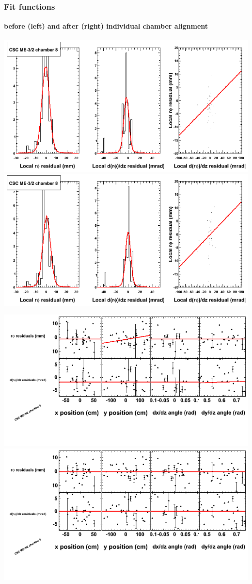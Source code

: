 \documentclass[compress]{beamer}
\begin{document}
\begin{frame}
\frametitle{Fit functions}
\framesubtitle{before (left) and after (right) individual chamber alignment}
\includegraphics[width=0.5\linewidth]{ringfits_3dof/beforefit_MEm32_08_bellcurve.png} \includegraphics[width=0.5\linewidth]{ringfits_3dof/afterfit_MEm32_08_bellcurve.png}

\includegraphics[width=0.5\linewidth]{ringfits_3dof/beforefit_MEm32_08_polynomials.png} \includegraphics[width=0.5\linewidth]{ringfits_3dof/afterfit_MEm32_08_polynomials.png}
\end{frame}
\end{document}

